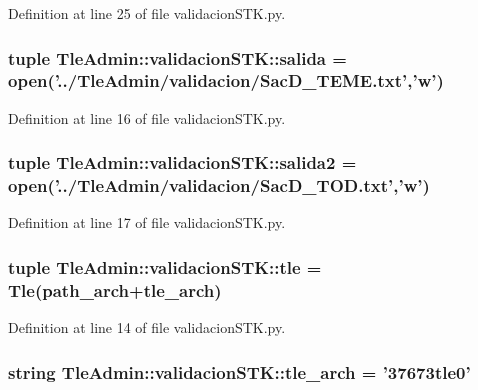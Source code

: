 \-Definition at line 25 of file validacion\-S\-T\-K.\-py.

\subsubsection[{salida}]{\setlength{\rightskip}{0pt plus 5cm}tuple {\bf \-Tle\-Admin\-::validacion\-S\-T\-K\-::salida} = open('../\-Tle\-Admin/validacion/\-Sac\-D\-\_\-\-T\-E\-M\-E.\-txt','w')}\label{namespace_tle_admin_1_1validacion_s_t_k_ac46cb5285a2758b9a64cb5fa19ae3bbc}


\-Definition at line 16 of file validacion\-S\-T\-K.\-py.

\subsubsection[{salida2}]{\setlength{\rightskip}{0pt plus 5cm}tuple {\bf \-Tle\-Admin\-::validacion\-S\-T\-K\-::salida2} = open('../\-Tle\-Admin/validacion/\-Sac\-D\-\_\-\-T\-O\-D.\-txt','w')}\label{namespace_tle_admin_1_1validacion_s_t_k_a305c49093f20fe9cf3e788ece32cb810}


\-Definition at line 17 of file validacion\-S\-T\-K.\-py.

\subsubsection[{tle}]{\setlength{\rightskip}{0pt plus 5cm}tuple {\bf \-Tle\-Admin\-::validacion\-S\-T\-K\-::tle} = {\bf \-Tle}({\bf path\-\_\-arch}+{\bf tle\-\_\-arch})}\label{namespace_tle_admin_1_1validacion_s_t_k_ac5816d7b27f0d7a75021c7889d9fc223}


\-Definition at line 14 of file validacion\-S\-T\-K.\-py.

\subsubsection[{tle\-\_\-arch}]{\setlength{\rightskip}{0pt plus 5cm}string {\bf \-Tle\-Admin\-::validacion\-S\-T\-K\-::tle\-\_\-arch} = '37673tle0'}\label{namespace_tle_admin_1_1validacion_s_t_k_aef1abd41149b959903df1af7a730fa84}


